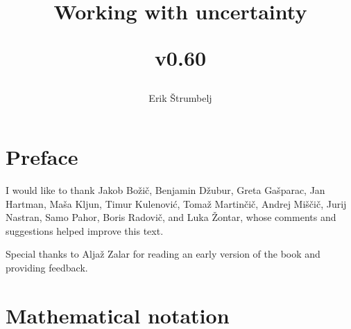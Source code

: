 \documentclass{book}
\title{\textbf{Working with uncertainty}\\ \begin{small}v0.60\end{small}}
\author{Erik \v{S}trumbelj}
\theoremstyle{plain}%
\theoremstyle{definition}
\begin{document}
\maketitle

\newpage

\tableofcontents

\chapter*{Preface}

I would like to thank Jakob Bo\v{z}i\v{c}, Benjamin Džubur, Greta Ga\v{s}parac, Jan Hartman, Ma\v{s}a Kljun, Timur Kulenovi\'{c}, Toma\v{z} Martin\v{c}i\v{c}, Andrej Mi\v{s}\v{c}i\v{c}, Jurij Nastran, Samo Pahor, Boris Radovič, and Luka \v{Z}ontar, whose comments and suggestions helped improve this text.

Special thanks to Alja\v{z} Zalar for reading an early version of the book and providing feedback.


\chapter*{Mathematical notation}
\end{document}
